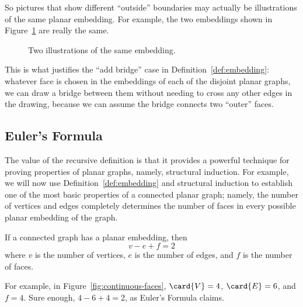 So pictures that show different ``outside'' boundaries may actually be
illustrations of the same planar embedding.  For example, the two
embeddings shown in Figure~\ref{fig:5DE} are really the same.

\begin{figure}


\caption{Two illustrations of the same embedding.}
\label{fig:5DE}
\end{figure}

This is what justifies the ``add bridge'' case in
Definition~\ref{def:embedding}: whatever face is chosen in the
embeddings of each of the disjoint planar graphs, we can draw a
bridge between them without needing to cross any other edges in the
drawing, because we can assume the bridge connects two ``outer''
faces.

\subsection{Euler's Formula}

The value of the recursive definition is that it provides a powerful
technique for proving properties of planar graphs, namely, structural
induction.  For example, we will now use
Definition~\ref{def:embedding} and structural induction to establish
one of the most basic properties of a connected planar graph; namely,
the number of vertices and edges completely determines the number of
faces in every possible planar embedding of the graph.

\begin{theorem}\label{thm:eulers_formula}
If a connected graph has a planar embedding, then
\begin{equation*}
    v - e + f = 2
\end{equation*}
where $v$ is the number of vertices, $e$ is the number of edges, and
$f$ is the number of faces.
\end{theorem}

For example, in Figure~\ref{fig:continuous-faces}, $\card{V} = 4$,
$\card{E} = 6$, and $f = 4$.  Sure enough, $4 - 6 + 4 = 2$, as Euler's
Formula claims.

